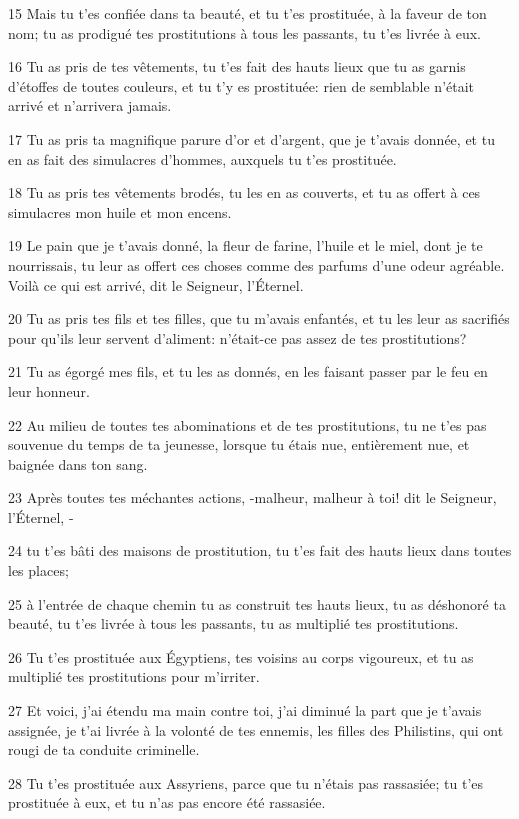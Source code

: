 \par 15 Mais tu t'es confiée dans ta beauté, et tu t'es prostituée, à la faveur de ton nom; tu as prodigué tes prostitutions à tous les passants, tu t'es livrée à eux.
\par 16 Tu as pris de tes vêtements, tu t'es fait des hauts lieux que tu as garnis d'étoffes de toutes couleurs, et tu t'y es prostituée: rien de semblable n'était arrivé et n'arrivera jamais.
\par 17 Tu as pris ta magnifique parure d'or et d'argent, que je t'avais donnée, et tu en as fait des simulacres d'hommes, auxquels tu t'es prostituée.
\par 18 Tu as pris tes vêtements brodés, tu les en as couverts, et tu as offert à ces simulacres mon huile et mon encens.
\par 19 Le pain que je t'avais donné, la fleur de farine, l'huile et le miel, dont je te nourrissais, tu leur as offert ces choses comme des parfums d'une odeur agréable. Voilà ce qui est arrivé, dit le Seigneur, l'Éternel.
\par 20 Tu as pris tes fils et tes filles, que tu m'avais enfantés, et tu les leur as sacrifiés pour qu'ils leur servent d'aliment: n'était-ce pas assez de tes prostitutions?
\par 21 Tu as égorgé mes fils, et tu les as donnés, en les faisant passer par le feu en leur honneur.
\par 22 Au milieu de toutes tes abominations et de tes prostitutions, tu ne t'es pas souvenue du temps de ta jeunesse, lorsque tu étais nue, entièrement nue, et baignée dans ton sang.
\par 23 Après toutes tes méchantes actions, -malheur, malheur à toi! dit le Seigneur, l'Éternel, -
\par 24 tu t'es bâti des maisons de prostitution, tu t'es fait des hauts lieux dans toutes les places;
\par 25 à l'entrée de chaque chemin tu as construit tes hauts lieux, tu as déshonoré ta beauté, tu t'es livrée à tous les passants, tu as multiplié tes prostitutions.
\par 26 Tu t'es prostituée aux Égyptiens, tes voisins au corps vigoureux, et tu as multiplié tes prostitutions pour m'irriter.
\par 27 Et voici, j'ai étendu ma main contre toi, j'ai diminué la part que je t'avais assignée, je t'ai livrée à la volonté de tes ennemis, les filles des Philistins, qui ont rougi de ta conduite criminelle.
\par 28 Tu t'es prostituée aux Assyriens, parce que tu n'étais pas rassasiée; tu t'es prostituée à eux, et tu n'as pas encore été rassasiée.
